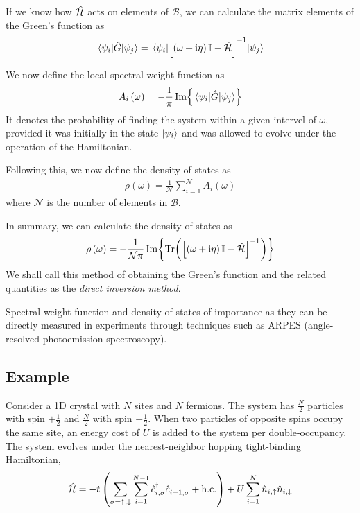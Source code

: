 	If we know how $ \hat{\mathcal{H}} $ acts on elements of $ \mathcal{B} $, we can calculate the matrix elements of the Green's function as
	\begin{align}
		\mel{\psi_i}{\hat{G}}{\psi_j} = \mel{\psi_i}{\left[ \left( \omega + \mathrm{i}\eta\right) \mathbb{I} - \hat{\mathcal{H}}\right]^{-1}}{\psi_j}
	\end{align}
	
	We now define the local spectral weight function as
	\begin{align}
		A_{i} \left( \omega \right) = -\frac{1}{\pi} \Im{ {\mel{\psi_i}{\hat{G}}{\psi_j}} }
	\end{align}
	It denotes the probability of finding the system within a given intervel of $ \omega $, provided it was initially in the state $ \ket{\psi_i} $ and was allowed to evolve under the operation of the Hamiltonian.
	
	Following this, we now define the density of states as
	\begin{align}\label{eqn:dossum}
		\rho \left( \omega \right) = \frac{1}{\mathcal{N}} \sum_{i = 1}^{\mathcal{N}} A_{i} \left( \omega \right)
	\end{align}
	where $ \mathcal{N} $ is the number of elements in $ \mathcal{B} $.
	
	In summary, we can calculate the density of states as
	\begin{align}\label{eqn:dosfinal}
		\rho \left( \omega \right) = -\frac{1}{\mathcal{N \pi}} \Im{ \Tr( \left[ \left( \omega + \mathrm{i}\eta\right) \mathbb{I} - \hat{\mathcal{H}}\right]^{-1} ) }
	\end{align}
	We shall call this method of obtaining the Green's function and the related quantities as the \emph{direct inversion method}.
	
	Spectral weight function and density of states of importance as they can be directly measured in experiments through techniques such as ARPES (angle-resolved photoemission spectroscopy).
	
	\subsection*{Example}
		Consider a 1D crystal with $ N $ sites and $ N $ fermions. The system has $ \tfrac{N}{2} $ particles with spin $ +\tfrac{1}{2} $ and $ \tfrac{N}{2} $ with spin $ -\tfrac{1}{2} $. When two particles of opposite spins occupy the same site, an energy cost of $ U $ is added to the system per double-occupancy. The system evolves under the nearest-neighbor hopping tight-binding Hamiltonian,
		\begin{align}\label{eqn:tight-binding-hamil}
			\hat{\mathcal{H}} = -t \left(\sum_{\sigma = \uparrow, \downarrow} \sum_{i=1}^{N-1} \hat{c}^{\dagger}_{i, \sigma} \hat{c}^{}_{i + 1, \sigma} + \mathrm{h.c.} \right) + U \sum_{i=1}^{N}\hat{n}_{i,\uparrow} \hat{n}_{i,\downarrow}
		\end{align}
		
